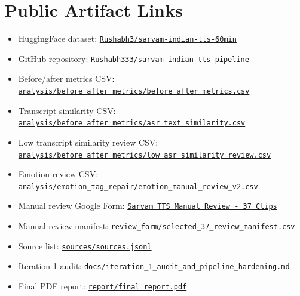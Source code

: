 \documentclass[11pt]{article}
\begin{document}
\appendix
\section{Public Artifact Links}

\begin{itemize}
    \item HuggingFace dataset: \href{https://huggingface.co/datasets/Rushabh3/sarvam-indian-tts-60min}{\texttt{Rushabh3/sarvam-indian-tts-60min}}
    \item GitHub repository: \href{https://github.com/Rushabh333/sarvam-indian-tts-pipeline}{\texttt{Rushabh333/sarvam-indian-tts-pipeline}}
    \item Before/after metrics CSV: \href{https://github.com/Rushabh333/sarvam-indian-tts-pipeline/blob/main/analysis/before_after_metrics/before_after_metrics.csv}{\texttt{analysis/before\_after\_metrics/before\_after\_metrics.csv}}
    \item Transcript similarity CSV: \href{https://github.com/Rushabh333/sarvam-indian-tts-pipeline/blob/main/analysis/before_after_metrics/asr_text_similarity.csv}{\texttt{analysis/before\_after\_metrics/asr\_text\_similarity.csv}}
    \item Low transcript similarity review CSV: \href{https://github.com/Rushabh333/sarvam-indian-tts-pipeline/blob/main/analysis/before_after_metrics/low_asr_similarity_review.csv}{\texttt{analysis/before\_after\_metrics/low\_asr\_similarity\_review.csv}}
    \item Emotion review CSV: \href{https://github.com/Rushabh333/sarvam-indian-tts-pipeline/blob/main/analysis/emotion_tag_repair/emotion_manual_review_v2.csv}{\texttt{analysis/emotion\_tag\_repair/emotion\_manual\_review\_v2.csv}}
    \item Manual review Google Form: \href{https://docs.google.com/forms/d/e/1FAIpQLSdWRh_ek1CADZmEORGfKX47R4YiNFZ44hmqzWTBAdvha5qeEA/viewform}{\texttt{Sarvam TTS Manual Review - 37 Clips}}
    \item Manual review manifest: \href{https://github.com/Rushabh333/sarvam-indian-tts-pipeline/blob/main/review_form/selected_37_review_manifest.csv}{\texttt{review\_form/selected\_37\_review\_manifest.csv}}
    \item Source list: \href{https://github.com/Rushabh333/sarvam-indian-tts-pipeline/blob/main/sources/sources.jsonl}{\texttt{sources/sources.jsonl}}
    \item Iteration 1 audit: \href{https://github.com/Rushabh333/sarvam-indian-tts-pipeline/blob/main/docs/iteration_1_audit_and_pipeline_hardening.md}{\texttt{docs/iteration\_1\_audit\_and\_pipeline\_hardening.md}}
    \item Final PDF report: \href{https://github.com/Rushabh333/sarvam-indian-tts-pipeline/blob/main/report/final_report.pdf}{\texttt{report/final\_report.pdf}}
\end{itemize}
\end{document}
